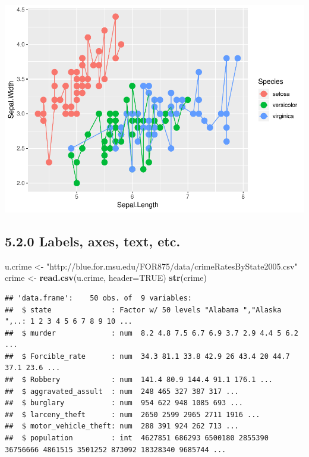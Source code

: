 \documentclass[]{article}
\newenvironment{Shaded}{\begin{snugshade}}{\end{snugshade}}
\newcommand{\KeywordTok}[1]{\textcolor[rgb]{0.13,0.29,0.53}{\textbf{#1}}}
\newcommand{\DataTypeTok}[1]{\textcolor[rgb]{0.13,0.29,0.53}{#1}}
\newcommand{\StringTok}[1]{\textcolor[rgb]{0.31,0.60,0.02}{#1}}
\newcommand{\OtherTok}[1]{\textcolor[rgb]{0.56,0.35,0.01}{#1}}
\newcommand{\NormalTok}[1]{#1}
\begin{document}
\includegraphics{stt-301-programming_files/figure-latex/unnamed-chunk-61-2.pdf}

\subsection{5.2.0 Labels, axes, text, etc.}\label{labels-axes-text-etc.}

\begin{Shaded}
\begin{Highlighting}[]
\NormalTok{u.crime <-}\StringTok{ "http://blue.for.msu.edu/FOR875/data/crimeRatesByState2005.csv"}
\NormalTok{crime <-}\StringTok{ }\KeywordTok{read.csv}\NormalTok{(u.crime, }\DataTypeTok{header=}\OtherTok{TRUE}\NormalTok{)}
\KeywordTok{str}\NormalTok{(crime)}
\end{Highlighting}
\end{Shaded}

\begin{verbatim}
## 'data.frame':    50 obs. of  9 variables:
##  $ state              : Factor w/ 50 levels "Alabama ","Alaska ",..: 1 2 3 4 5 6 7 8 9 10 ...
##  $ murder             : num  8.2 4.8 7.5 6.7 6.9 3.7 2.9 4.4 5 6.2 ...
##  $ Forcible_rate      : num  34.3 81.1 33.8 42.9 26 43.4 20 44.7 37.1 23.6 ...
##  $ Robbery            : num  141.4 80.9 144.4 91.1 176.1 ...
##  $ aggravated_assult  : num  248 465 327 387 317 ...
##  $ burglary           : num  954 622 948 1085 693 ...
##  $ larceny_theft      : num  2650 2599 2965 2711 1916 ...
##  $ motor_vehicle_theft: num  288 391 924 262 713 ...
##  $ population         : int  4627851 686293 6500180 2855390 36756666 4861515 3501252 873092 18328340 9685744 ...
\end{verbatim}
\end{document}
